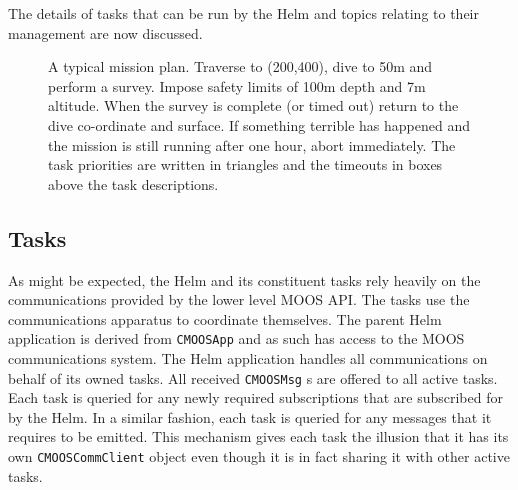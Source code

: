 \documentclass[a4paper,10pt]{article}
\newcommand{\Code}[1]{\texttt{#1} }
\newcommand{\code}[1]{\Code{#1} }
\begin{document}
The details of tasks that can be run by the Helm and topics
relating to their management are now discussed.

\begin{figure}[ht]
\centering {}
\caption{A typical mission plan. Traverse to (200,400), dive to
50m and perform a survey. Impose safety limits of 100m depth and
7m altitude. When the survey is complete (or timed out) return to
the dive co-ordinate and surface. If something terrible has
happened and the mission is still running after one hour, abort
immediately. The task priorities are written in triangles and the
timeouts in boxes above the task descriptions.}
\end{figure}

\subsection{Tasks}
As might be expected, the Helm and its constituent tasks rely
heavily on the communications provided by the lower level MOOS
API. The tasks use the communications apparatus to coordinate
themselves. The parent Helm application is derived from
\code{CMOOSApp} and as such has access to the MOOS communications
system. The Helm application handles all communications on behalf
of its owned tasks. All received \code{CMOOSMsg}s are offered to
all active tasks. Each task is queried for any newly required
subscriptions that are subscribed for by the Helm. In a similar
fashion, each task is queried for any messages that it requires to
be emitted. This mechanism gives each task the illusion that it
has its own \code{CMOOSCommClient} object even though it is in
fact sharing it with  other active tasks.
\end{document}
